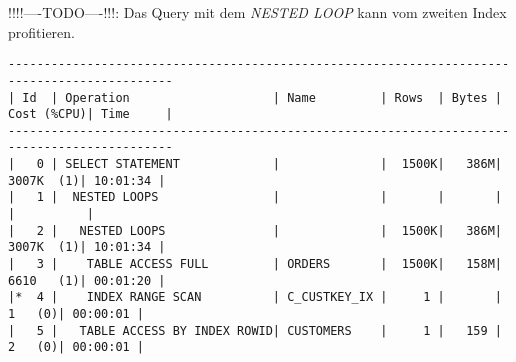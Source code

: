 \documentclass[11pt,a4paper,parskip=half]{scrartcl}
\begin{document}
!!!!----TODO----!!!: Das Query mit dem \emph{NESTED LOOP} kann vom zweiten Index profitieren.
\begin{lstlisting}
---------------------------------------------------------------------------------------------                                                                                                                                                                                                                
| Id  | Operation                    | Name         | Rows  | Bytes | Cost (%CPU)| Time     |                                                                                                                                                                                                                
---------------------------------------------------------------------------------------------                                                                                                                                                                                                                
|   0 | SELECT STATEMENT             |              |  1500K|   386M|  3007K  (1)| 10:01:34 |                                                                                                                                                                                                                
|   1 |  NESTED LOOPS                |              |       |       |            |          |                                                                                                                                                                                                                
|   2 |   NESTED LOOPS               |              |  1500K|   386M|  3007K  (1)| 10:01:34 |                                                                                                                                                                                                                
|   3 |    TABLE ACCESS FULL         | ORDERS       |  1500K|   158M|  6610   (1)| 00:01:20 |                                                                                                                                                                                                                
|*  4 |    INDEX RANGE SCAN          | C_CUSTKEY_IX |     1 |       |     1   (0)| 00:00:01 |                                                                                                                                                                                                                
|   5 |   TABLE ACCESS BY INDEX ROWID| CUSTOMERS    |     1 |   159 |     2   (0)| 00:00:01 |                                                                                                                                                                                                                

\end{lstlisting}
\end{document}
